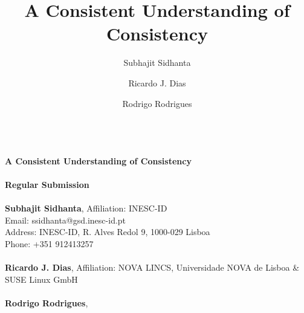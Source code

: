 \documentclass[acmlarge, ,11pt]{acmart}
\begin{document}
\title{A Consistent Understanding of Consistency}
\author{Subhajit Sidhanta}
\author{Ricardo J. Dias}
\author{Rodrigo Rodrigues}
\textbf{\\A Consistent Understanding of Consistency} \\
~\\
\textbf{Regular Submission} \\ \\
\textbf{Subhajit Sidhanta}, %
%
  Affiliation: INESC-ID\\
  Email: ssidhanta@gsd.inesc-id.pt\\
Address: INESC-ID, R. Alves Redol 9, 1000-029 Lisboa\\
Phone: +351 912413257\\ \\
\textbf{Ricardo J. Dias}, %
  Affiliation:  NOVA LINCS, Universidade NOVA de Lisboa \& SUSE Linux GmbH\\ \\
\textbf{Rodrigo Rodrigues}, %
\end{document}
